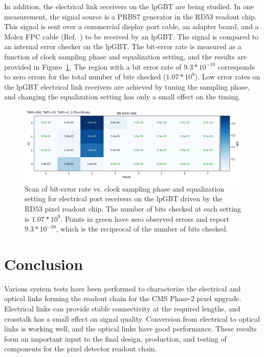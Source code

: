 \documentclass[a4paper,11pt]{article}
\newcommand{\fig}{Figure}
\begin{document}

In addition, the electrical link receivers on the lpGBT are being studied.
In one measurement, the signal source is a PRBS7 generator in the RD53 readout chip.
This signal is sent over a commercial display port cable, an adapter board, and a Molex FPC cable (Ref.~\cite{ref:molex_cable}) to be received by an lpGBT.
The signal is compared to an internal error checker on the lpGBT.
The bit-error rate is measured as a function of clock sampling phase and equalization setting, and the results are provided in \fig~\ref{fig:lpgbt_bert}.
The region with a bit error rate of $9.3 * 10^{-10}$ corresponds to zero errors for the total number of bits checked ($1.07 * 10^{9}$).
Low error rates on the lpGBT electrical link receivers are achieved by tuning the sampling phase, and changing the equalization setting has only a small effect on the timing.


\begin{figure}[htbp]
\centering
\includegraphics[width=1.0\textwidth,origin=c]{../figures/lpGBT_bert.png}
\caption{
\label{fig:lpgbt_bert}
Scan of bit-error rate vs. clock sampling phase and equalization setting for electrical port receivers on the lpGBT driven by the RD53 pixel readout chip.
The number of bits checked at each setting is $1.07 * 10^{9}$.
Points in green have zero observed errors and report $9.3 * 10^{-10}$, which is the reciprocal of the number of bits checked.
}
\end{figure}

\section{Conclusion}
\label{sec:conclusion}

Various system tests have been performed to characterize the electrical and optical links forming the readout chain for the CMS Phase-2 pixel upgrade.
Electrical links can provide stable connectivity at the required lengths, and crosstalk has a small effect on signal quality.
Conversion from electrical to optical links is working well, and the optical links have good performance.
These results form an important input to the final design, production, and testing of components for the pixel detector readout chain.
\end{document}

